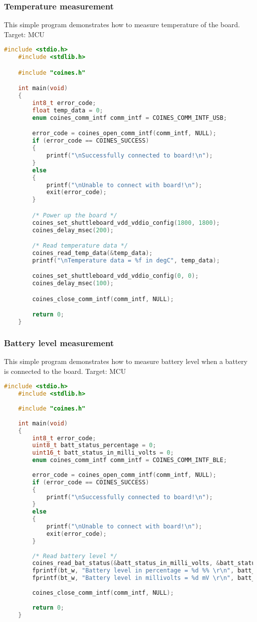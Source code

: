 \documentclass{article}
\begin{document}
\subsubsection{Temperature measurement}
This simple program demonstrates how to measure temperature of the board.
\newline Target: MCU
\begin{lstlisting}[language=c]
	#include <stdio.h>
	#include <stdlib.h>

	#include "coines.h"

	int main(void)
	{
		int8_t error_code;
		float temp_data = 0;
		enum coines_comm_intf comm_intf = COINES_COMM_INTF_USB;

		error_code = coines_open_comm_intf(comm_intf, NULL);
		if (error_code == COINES_SUCCESS)
		{
			printf("\nSuccessfully connected to board!\n");
		}
		else
		{
			printf("\nUnable to connect with board!\n");
			exit(error_code);
		}

		/* Power up the board */
		coines_set_shuttleboard_vdd_vddio_config(1800, 1800);
		coines_delay_msec(200);

		/* Read temperature data */
		coines_read_temp_data(&temp_data);
		printf("\nTemperature data = %f in degC", temp_data);

		coines_set_shuttleboard_vdd_vddio_config(0, 0);
		coines_delay_msec(100);

		coines_close_comm_intf(comm_intf, NULL);

		return 0;
	}
\end{lstlisting}

\subsubsection{Battery level measurement}
This simple program demonstrates how to measure battery level when a battery is connected to the board.
\newline Target: MCU
\begin{lstlisting}[language=c]
	#include <stdio.h>
	#include <stdlib.h>
	
	#include "coines.h"
	
	int main(void)
	{
		int8_t error_code;
		uint8_t batt_status_percentage = 0;
		uint16_t batt_status_in_milli_volts = 0;
		enum coines_comm_intf comm_intf = COINES_COMM_INTF_BLE;
	
		error_code = coines_open_comm_intf(comm_intf, NULL);
		if (error_code == COINES_SUCCESS)
		{
			printf("\nSuccessfully connected to board!\n");
		}
		else
		{
			printf("\nUnable to connect with board!\n");
			exit(error_code);
		}
	
		/* Read battery level */
		coines_read_bat_status(&batt_status_in_milli_volts, &batt_status_percentage);
		fprintf(bt_w, "Battery level in percentage = %d %% \r\n", batt_status_percentage);
		fprintf(bt_w, "Battery level in millivolts = %d mV \r\n", batt_status_in_milli_volts);
	
		coines_close_comm_intf(comm_intf, NULL);
	
		return 0;
	}
\end{lstlisting}
\end{document}
